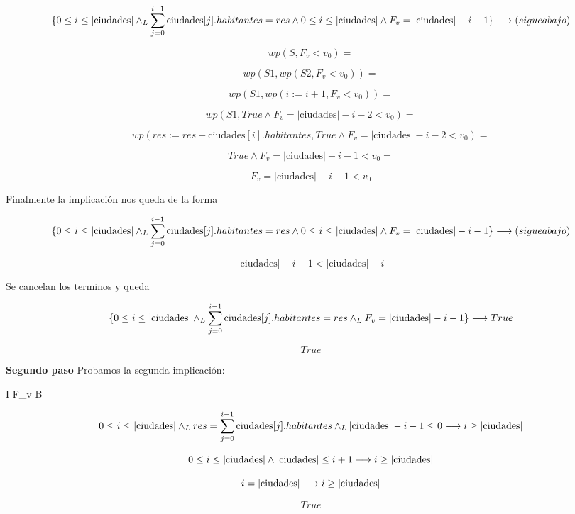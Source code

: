 \documentclass[10pt,a4paper]{article}
\begin{document}
\[
\{0 \leq i \leq |\text{ciudades}| \land _L \sum_{j=0}^{i-1} \text{ciudades}[j].habitantes = res \land 0 \leq i \leq |\text{ciudades}| \land F_v = |\text{ciudades}| - i - 1\} \longrightarrow (sigue abajo)
\]

\[
wp(S, F_v < v_0) =
\]

\[
wp(S1, wp(S2, F_v < v_0)) =
\]

\[
wp(S1, wp(i:=i+1, F_v < v_0)) =
\]

\[
wp(S1, True \land F_v = |\text{ciudades}| - i - 2 < v_0) =
\]

\[
wp(res:= res + \text{ciudades}[i].habitantes, True \land F_v = |\text{ciudades}| - i - 2 < v_0) = 
\]

\[
True \land F_v = |\text{ciudades}| - i - 1 < v_0 =
\]

\[
F_v = |\text{ciudades}| - i - 1 < v_0
\]

Finalmente la implicación nos queda de la forma

\[
\{0 \leq i \leq |\text{ciudades}| \land _L \sum_{j=0}^{i-1} \text{ciudades}[j].habitantes = res \land 0 \leq i \leq |\text{ciudades}| \land F_v = |\text{ciudades}| - i - 1\} \longrightarrow (sigue abajo)
\]

\[
|\text{ciudades}| - i - 1 < |\text{ciudades}| - i 
\]

Se cancelan los terminos y queda

\[
\{0 \leq i \leq |\text{ciudades}| \land _L \sum_{j=0}^{i-1} \text{ciudades}[j].habitantes = res \land _L F_v = |\text{ciudades}| - i - 1 \} \longrightarrow True
\]

\[
True
\]

\textbf{Segundo paso} Probamos la segunda implicación:

I \land F_v  \implica \neg B

\[
0 \leq i \leq |\text{ciudades}| \land _L res = \sum_{j=0}^{i-1} \text{ciudades}[j].habitantes \land _L |\text{ciudades}| - i - 1 \leq 0 \longrightarrow i \geq |\text{ciudades}|
\]

\[
0 \leq i \leq |\text{ciudades}| \land |\text{ciudades}| \leq i + 1 \longrightarrow i \geq |\text{ciudades}|
\]

\[
i = |\text{ciudades}| \longrightarrow i \geq |\text{ciudades}|
\]

\[
True
\]
\end{document}

